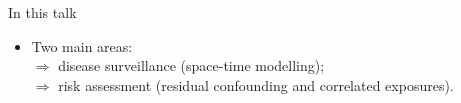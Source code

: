 \documentclass[slidestop,compress,serif,10pt]{beamer}
\begin{document}
\begin{frame}
\begin{center}
{}
\end{center}

\vspace{4cm}
In this talk\\
\begin{itemize}
\item Two main areas: \\
$\Rightarrow$ disease surveillance (space-time modelling);\\
$\Rightarrow$ risk assessment (residual confounding and correlated exposures).
\end{itemize}
\end{frame}

\end{document}
